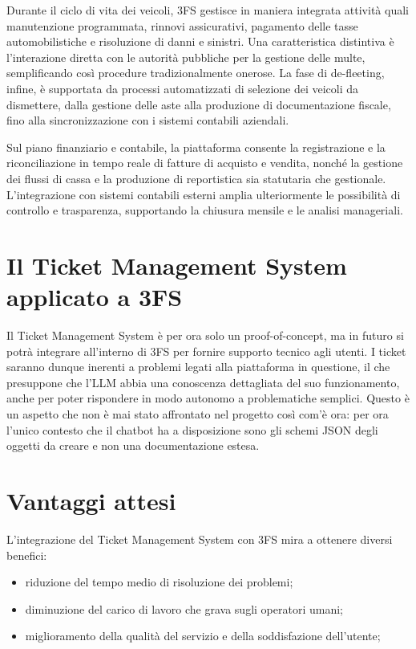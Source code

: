 Durante il ciclo di vita dei veicoli, 3FS{\textsuperscript{\tiny\textcopyright}} gestisce in maniera integrata attività quali manutenzione programmata, rinnovi assicurativi,
pagamento delle tasse automobilistiche e risoluzione di danni e sinistri. Una caratteristica distintiva è l'interazione diretta con le autorità
pubbliche per la gestione delle multe, semplificando così procedure tradizionalmente onerose. La fase di de-fleeting, infine, è supportata
da processi automatizzati di selezione dei veicoli da dismettere, dalla gestione delle aste alla produzione di documentazione fiscale, fino
alla sincronizzazione con i sistemi contabili aziendali.

Sul piano finanziario e contabile, la piattaforma consente la registrazione e la riconciliazione in tempo reale di fatture di acquisto e vendita,
nonché la gestione dei flussi di cassa e la produzione di reportistica sia statutaria che gestionale. L'integrazione con sistemi contabili esterni
amplia ulteriormente le possibilità di controllo e trasparenza, supportando la chiusura mensile e le analisi manageriali. \cite{progesoftware_3fs}

\newpage
\section{\texorpdfstring{Il Ticket Management System applicato a 3FS{\textsuperscript{\tiny\textcopyright}}}{Il Ticket Management System applicato a 3FS (c)}}
Il Ticket Management System è per ora solo un proof-of-concept, ma in futuro si potrà integrare all'interno di 3FS{\textsuperscript{\tiny\textcopyright}} per fornire supporto tecnico agli utenti.
I ticket saranno dunque inerenti a problemi legati alla piattaforma in questione, il che presuppone che l'LLM abbia una conoscenza dettagliata del suo funzionamento,
anche per poter rispondere in modo autonomo a problematiche semplici.
Questo è un aspetto che non è mai stato affrontato nel progetto così com'è ora: per ora l'unico contesto che il chatbot ha a disposizione sono gli schemi JSON degli oggetti
da creare e non una documentazione estesa.

\newpage
\section{Vantaggi attesi}
L'integrazione del Ticket Management System con 3FS{\textsuperscript{\tiny\textcopyright}} mira a ottenere diversi benefici:
\begin{itemize}
    \item riduzione del tempo medio di risoluzione dei problemi;
    \item diminuzione del carico di lavoro che grava sugli operatori umani;
    \item miglioramento della qualità del servizio e della soddisfazione dell'utente;
\end{itemize}

